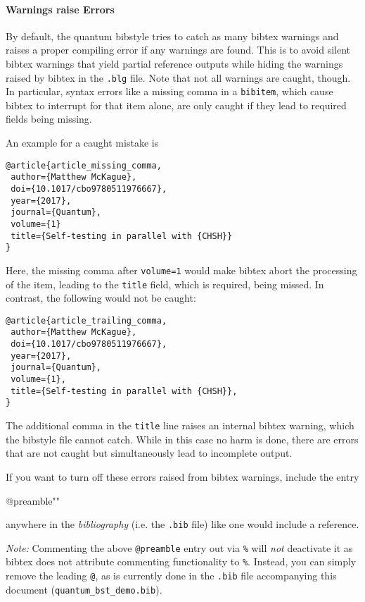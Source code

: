 \documentclass[a4paper,twocolumn,11pt]{quantumarticle}
\begin{document}
\paragraph{Warnings raise Errors}
By default, the quantum bibstyle tries to catch as many bibtex warnings and raises a proper compiling error if any warnings are found. This is to avoid silent bibtex warnings that yield partial reference outputs while hiding the warnings raised by bibtex in the \texttt{.blg} file.
Note that not all warnings are caught, though. In particular, syntax errors like a missing comma in a \texttt{bibitem}, which cause bibtex to interrupt for that item alone, are only caught if they lead to required fields being missing.

An example for a caught mistake is
{\small
\begin{verbatim}
@article{article_missing_comma,
 author={Matthew McKague},
 doi={10.1017/cbo9780511976667},
 year={2017},
 journal={Quantum},
 volume={1}
 title={Self-testing in parallel with {CHSH}}
}
\end{verbatim}
}
Here, the missing comma after \texttt{volume={1}} would make bibtex abort the processing of the item, leading
to the \texttt{title} field, which is required, being missed.
In contrast, the following would not be caught:
{\small
\begin{verbatim}
@article{article_trailing_comma,
 author={Matthew McKague},
 doi={10.1017/cbo9780511976667},
 year={2017},
 journal={Quantum},
 volume={1},
 title={Self-testing in parallel with {CHSH}},
}
\end{verbatim}
}
The additional comma in the \texttt{title} line raises an internal bibtex warning, which the bibstyle file cannot catch. While in this case no harm is done, there are errors that are not caught but simultaneously lead to incomplete output.

If you want to turn off these errors raised from bibtex warnings, include the entry
\begin{verbatim*}
@preamble{"\DoNotMakeWarningsErrors"}
\end{verbatim*}
anywhere in the \emph{bibliography} (i.e. the \texttt{.bib} file) like one would include a reference.

\emph{Note:} Commenting the above \texttt{@preamble} entry out via \texttt{\%} will \emph{not} deactivate it as bibtex does not attribute commenting functionality to \texttt{\%}. Instead, you can simply remove the leading \texttt{@}, as is currently done in the \texttt{.bib} file accompanying this document (\texttt{quantum\_bst\_demo.bib}).
\end{document}
